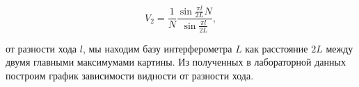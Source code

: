 \documentclass[12pt]{kiarticle}
\begin{document}
\begin{equation}\label{V_2}
V_2 = \dfrac{1}{N} \dfrac{\sin {\frac{\pi l}{2L}N}}{\sin {\frac{\pi l}{2L}}},
\end{equation}

от разности хода $ l $, мы находим базу интерферометра $ L $ как расстояние $ 2L $ между двумя главными максимумами картины.  Из полученных в лабораторной данных построим график зависимости видности от разности хода.

%
%
%
%
%
%
%
%
\end{document}
